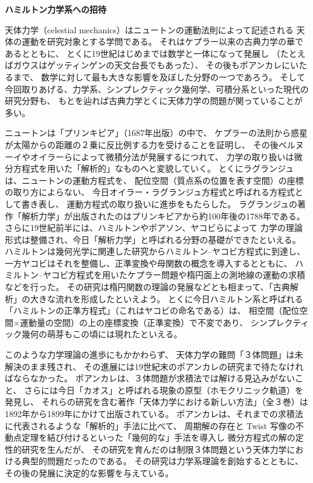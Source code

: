 \documentclass[uplatex,dvipdfmx]{jlreq}
\begin{document}
\noindent
{\large\bfseries ハミルトン力学系への招待}

\medskip
\hspace*{\fill}{\large\bfseries 伊藤 秀一（東工大・理）}

\bigskip\bigskip

天体力学（celestial mechanics）はニュートンの運動法則によって記述される
天体の運動を研究対象とする学問である。
それはケプラー以来の古典力学の華であるとともに、
とくに19世紀はじめまでは数学と一体になって発展し
（たとえばガウスはゲッティンゲンの天文台長でもあった）、
その後もポアンカレにいたるまで、
数学に対して最も大きな影響を及ぼした分野の一つであろう。
そして今回取りあげる、力学系、シンプレクティック幾何学、可積分系といった現代の研究分野も、
もとを辿れば古典力学とくに天体力学の問題が関っていることが多い。

ニュートンは「プリンキピア」（1687年出版）の中で、
ケプラーの法則から惑星が太陽からの距離の２乗に反比例する力を受けることを証明し、
その後ベルヌーイやオイラーらによって微積分法が発展するにつれて、
力学の取り扱いは微分方程式を用いた「解析的」なものへと変貌していく。
とくにラグランジュは、ニュートンの運動方程式を、
配位空間（質点系の位置を表す空間）の座標の取り方によらない、
今日オイラー・ラグランジュ方程式と呼ばれる方程式として書き表し、
運動方程式の取り扱いに進歩をもたらした。
ラグランジュの著作「解析力学」が出版されたのはプリンキピアから約100年後の1788年である。
さらに19世紀前半には、ハミルトンやポアソン、ヤコビらによって
力学の理論形式は整備され、今日「解析力学」と呼ばれる分野の基礎ができたといえる。
ハミルトンは幾何光学に関連した研究からハミルトン--ヤコビ方程式に到達し、
一方ヤコビはそれを整備し、正準変換や母関数の概念を導入するとともに、
ハミルトン--ヤコビ方程式を用いたケプラー問題や楕円面上の測地線の運動の求積などを行った。
その研究は楕円関数の理論の発展などとも相まって、「古典解析」の大きな流れを形成したといえよう。
とくに今日ハミルトン系と呼ばれる「ハミルトンの正準方程式」（これはヤコビの命名である）は、
相空間（配位空間×運動量の空間）の上の座標変換（正準変換）で不変であり、
シンプレクティック幾何の萌芽もこの頃には現れたといえる。

このような力学理論の進歩にもかかわらず、
天体力学の難問「３体問題」は未解決のまま残され、
その進展には19世紀末のポアンカレの研究まで待たなければならなかった。
ポアンカレは、３体問題が求積法では解ける見込みがないこと、
さらには今日「カオス」と呼ばれる現象の原型（ホモクリニック軌道）を発見し、
それらの研究を含む著作「天体力学における新しい方法」（全３巻）は
1892年から1899年にかけて出版されている。
ポアンカレは、それまでの求積法に代表されるような「解析的」手法に比べて、
周期解の存在と Twist 写像の不動点定理を結び付けるといった「幾何的な」手法を導入し
微分方程式の解の定性的研究を生んだが、
その研究を育んだのは制限３体問題という天体力学における典型的問題だったのである。
その研究は力学系理論を創始するとともに、その後の発展に決定的な影響を与えている。
\end{document}
